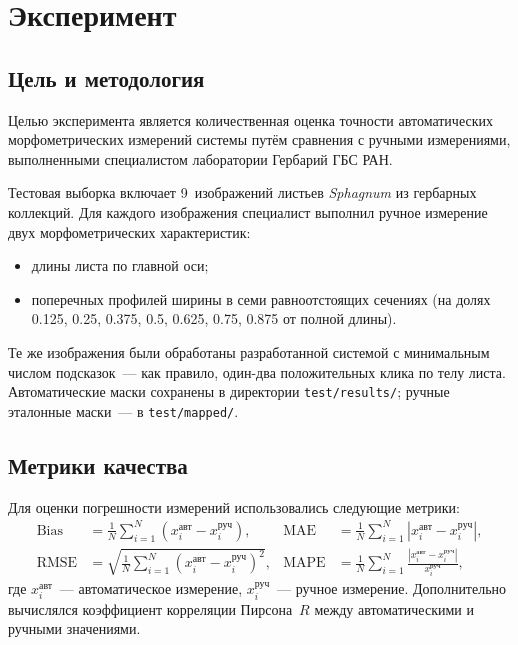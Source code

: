 
\section{Эксперимент}
\label{sec:experiment}

\subsection{Цель и методология}

Целью эксперимента является количественная оценка точности автоматических морфометрических измерений
системы путём сравнения с ручными измерениями, выполненными специалистом лаборатории Гербарий ГБС РАН.

Тестовая выборка включает 9~изображений листьев \textit{Sphagnum} из гербарных коллекций.
Для каждого изображения специалист выполнил ручное измерение двух морфометрических характеристик:
\begin{itemize}
    \item длины листа по главной оси;
    \item поперечных профилей ширины в семи равноотстоящих сечениях
          (на долях 0.125, 0.25, 0.375, 0.5, 0.625, 0.75, 0.875 от полной длины).
\end{itemize}

Те же изображения были обработаны разработанной системой с минимальным числом подсказок~---
как правило, один-два положительных клика по телу листа.
Автоматические маски сохранены в директории \texttt{test/results/};
ручные эталонные маски~--- в \texttt{test/mapped/}.

\subsection{Метрики качества}

Для оценки погрешности измерений использовались следующие метрики:
\begin{align*}
    \text{Bias} &= \frac{1}{N}\sum_{i=1}^{N}(x_i^\text{авт} - x_i^\text{руч}),
    &\text{MAE} &= \frac{1}{N}\sum_{i=1}^{N}|x_i^\text{авт} - x_i^\text{руч}|, \\
    \text{RMSE} &= \sqrt{\frac{1}{N}\sum_{i=1}^{N}(x_i^\text{авт} - x_i^\text{руч})^2},
    &\text{MAPE} &= \frac{1}{N}\sum_{i=1}^{N}\frac{|x_i^\text{авт} - x_i^\text{руч}|}{x_i^\text{руч}},
\end{align*}
где $x_i^\text{авт}$~--- автоматическое измерение, $x_i^\text{руч}$~--- ручное измерение.
Дополнительно вычислялся коэффициент корреляции Пирсона~$R$ между автоматическими и ручными значениями.

